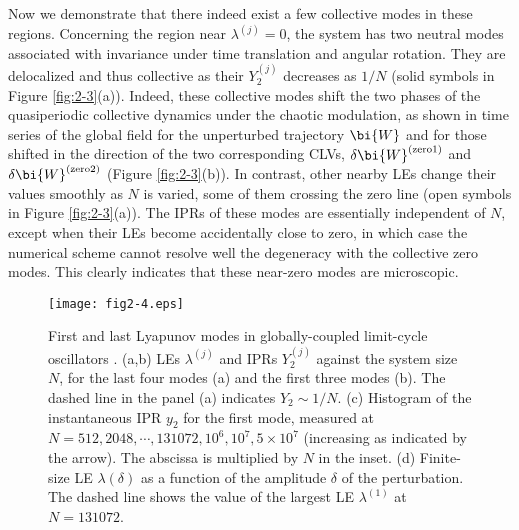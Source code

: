 \documentclass[12pt]{iopart}
\begin{document}
Now we demonstrate that
 there indeed exist a few collective modes in these regions.
Concerning the region near $\lambda^{(j)} = 0$,
 the system has two neutral modes associated with invariance
 under time translation and angular rotation.
They are delocalized and thus collective
 as their $Y_2^{(j)}$ decreases as $1/N$
 (solid symbols in Figure \ref{fig:2-3}(a)).
Indeed, these collective modes shift the two phases
 of the quasiperiodic collective dynamics under the chaotic modulation,
 as shown in time series of the global field for the unperturbed trajectory
 $\bi{W}$ and for those shifted in the direction of the two corresponding CLVs,
 $\delta\bi{W}^{\mathrm{(zero1)}}$ and $\delta\bi{W}^{\mathrm{(zero2)}}$
 (Figure \ref{fig:2-3}(b)).
In contrast, other nearby LEs change their values smoothly as $N$ is varied,
 some of them crossing the zero line
 (open symbols in Figure \ref{fig:2-3}(a)).
The IPRs of these modes are essentially independent of $N$,
 except when their LEs become accidentally close to zero,
 in which case the numerical scheme cannot resolve well
 the degeneracy with the collective zero modes.
This clearly indicates that these near-zero modes are microscopic.

\begin{figure}[t]
 \begin{center}
  \texttt{[image: fig2-4.eps]}
  \caption{First and last Lyapunov modes in globally-coupled limit-cycle oscillators . (a,b) LEs $\lambda^{(j)}$ and IPRs $Y_2^{(j)}$ against the system size $N$, for the last four modes (a) and the first three modes (b). The dashed line in the panel (a) indicates $Y_2 \sim 1/N$. (c) Histogram of the instantaneous IPR $y_2$ for the first mode, measured at $N = 512, 2048, \cdots, 131072, 10^6, 10^7, 5 \times 10^7$ (increasing as indicated by the arrow). The abscissa is multiplied by $N$ in the inset. (d) Finite-size LE $\lambda(\delta)$ as a function of the amplitude $\delta$ of the perturbation. The dashed line shows the value of the largest LE $\lambda^{(1)}$ at $N=131072$.}
  \label{fig:2-4}
 \end{center}
\end{figure}%
\end{document}
